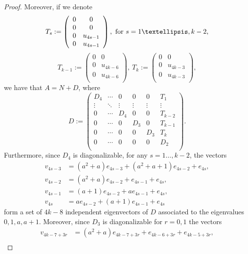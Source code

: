\documentclass[10pt,a4paper]{amsart}
\begin{document}
\begin{proof}
Moreover, if we denote
$$T_s:=\left(
   \begin{array}{cc}
       0 &0\\
       0 &0\\
       0 &u_{4s-1}\\
       0 &u_{4s-1}\\
   \end{array}
 \right),\hbox{ for $s=1\dots, k-2$,}
$$
$$T_{k-1}:=\left(
   \begin{array}{cc}
        0 & 0\\
        0 &u_{4k-6}\\
        0 &u_{4k-6}\\
   \end{array}
 \right),\ T_{k}:=\left(
   \begin{array}{cc}
        0 & 0\\
        0 &u_{4k-3}\\
        0 &u_{4k-3}\\
   \end{array}
 \right),
 $$
we have that $A=N+D$, where
$$D:=\left(
         \begin{array}{cccccc}
           D_4 & \cdots & 0 & 0 & 0 & T_1 \\
           \vdots & \ddots & \vdots & \vdots & \vdots & \vdots \\
           0 & \cdots & D_4 & 0 & 0 & T_{k-2} \\
           0 & \cdots & 0 & D_3 & 0 & T_{k-1} \\
           0 & \cdots & 0 & 0 & D_3 & T_k \\
           0 & \cdots & 0 & 0 & 0 & D_2 \\
         \end{array}
       \right).$$
Furthermore, since $D_4$ is diagonalizable, for any $s=1\dots, k-2$, the vectors
\begin{align*}
 v_{4s-3}&=(a^2+a)e_{4s-3}+(a^2+a+1)e_{4s-2}+e_{4s},\\
 v_{4s-2}&=(a^2+a)e_{4s-2}+e_{4s-1}+e_{4s},\\
 v_{4s-1}&=(a+1)e_{4s-2}+a e_{4s-1}+e_{4s},\\
 v_{4s}&=a e_{4s-2}+(a+1) e_{4s-1}+e_{4s}
\end{align*}
form a set of $4k-8$ independent eigenvectors of $D$ associated to the eigenvalues $0,1,a,a+1$. Moreover, since $D_3$ is diagonalizable for $r=0,1$ the vectors
\begin{align*}
 v_{4k-7+3r}&=(a^2+a)e_{4k-7+3r}+e_{4k-6+3r}+e_{4k-5+3r},\\

\end{align*}
\end{proof}
\end{document}
